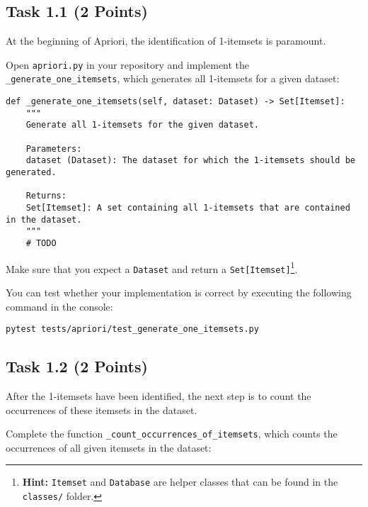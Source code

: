 \documentclass[
english,
smallborders
]{i6prcsht}
\newcommand{\points}[1]{\hfill \color{red}(#1 Points)\color{black}}
\begin{document}
\subsection*{Task 1.1 \points{2}}

At the beginning of Apriori, the identification of 1-itemsets is paramount.

Open \texttt{apriori.py} in your repository and implement the \texttt{\_generate\_one\_itemsets}, which generates all 1-itemsets for a given dataset:

\vspace*{0.3cm}

\begin{lstlisting}
def _generate_one_itemsets(self, dataset: Dataset) -> Set[Itemset]:
	"""
	Generate all 1-itemsets for the given dataset.

	Parameters:
	dataset (Dataset): The dataset for which the 1-itemsets should be generated.

	Returns:
	Set[Itemset]: A set containing all 1-itemsets that are contained in the dataset.
	"""
	# TODO
\end{lstlisting}

\vspace*{0.1cm}

Make sure that you expect a \texttt{Dataset} and return a \texttt{Set[Itemset]}\footnote{\textbf{Hint:} \texttt{Itemset} and \texttt{Database} are helper classes that can be found in the \texttt{classes/} folder.}.

You can test whether your implementation is correct by executing the following command in the console:

\vspace*{0.3cm}

\begin{lstlisting}
pytest tests/apriori/test_generate_one_itemsets.py
\end{lstlisting}

\vspace*{0.1cm}

\subsection*{Task 1.2 \points{2}}

After the 1-itemsets have been identified, the next step is to count the occurrences of these itemsets in the dataset.

Complete the function \texttt{\_count\_occurrences\_of\_itemsets}, which counts the occurrences of all given itemsets in the dataset:
\end{document}
